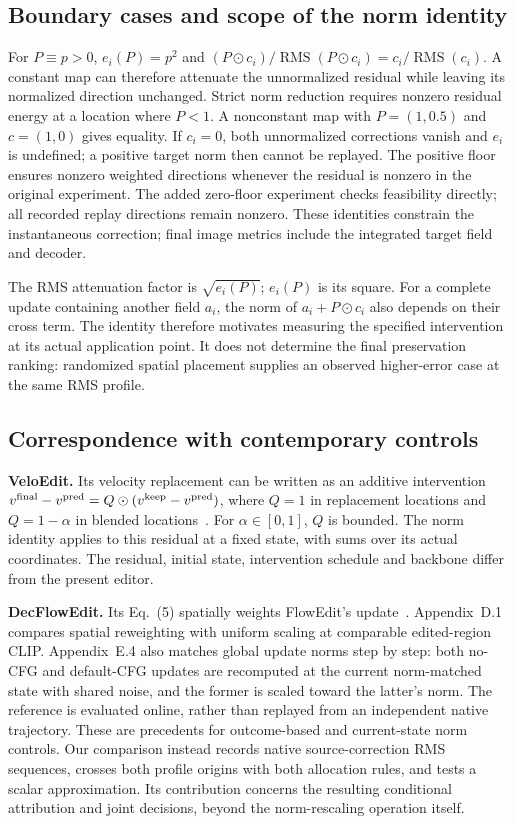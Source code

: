 \documentclass[10pt,doubleanonymous]{ieeeconf}
\newcommand{\RMS}{\operatorname{RMS}}
\begin{document}
\subsection{Boundary cases and scope of the norm identity}
For $P\equiv p>0$, $e_i(P)=p^2$ and $(P\odot c_i)/\RMS(P\odot c_i)=c_i/\RMS(c_i)$. A constant map can therefore attenuate the unnormalized residual while leaving its normalized direction unchanged. Strict norm reduction requires nonzero residual energy at a location where $P<1$. A nonconstant map with $P=(1,0.5)$ and $c=(1,0)$ gives equality. If $c_i=0$, both unnormalized corrections vanish and $e_i$ is undefined; a positive target norm then cannot be replayed. The positive floor ensures nonzero weighted directions whenever the residual is nonzero in the original experiment. The added zero-floor experiment checks feasibility directly; all recorded replay directions remain nonzero. These identities constrain the instantaneous correction; final image metrics include the integrated target field and decoder.

The RMS attenuation factor is $\sqrt{e_i(P)}$; $e_i(P)$ is its square. For a complete update containing another field $a_i$, the norm of $a_i+P\odot c_i$ also depends on their cross term. The identity therefore motivates measuring the specified intervention at its actual application point. It does not determine the final preservation ranking: randomized spatial placement supplies an observed higher-error case at the same RMS profile.

\subsection{Correspondence with contemporary controls}
\textbf{VeloEdit.} Its velocity replacement can be written as an additive intervention $v^{\rm final}-v^{\rm pred}=Q\odot(v^{\rm keep}-v^{\rm pred})$, where $Q=1$ in replacement locations and $Q=1-\alpha$ in blended locations~\cite{li2026veloedit}. For $\alpha\in[0,1]$, $Q$ is bounded. The norm identity applies to this residual at a fixed state, with sums over its actual coordinates. The residual, initial state, intervention schedule and backbone differ from the present editor.

\textbf{DecFlowEdit.} Its Eq.~(5) spatially weights FlowEdit's update~\cite{zhan2026decflowedit}. Appendix~D.1 compares spatial reweighting with uniform scaling at comparable edited-region CLIP. Appendix~E.4 also matches global update norms step by step: both no-CFG and default-CFG updates are recomputed at the current norm-matched state with shared noise, and the former is scaled toward the latter's norm. The reference is evaluated online, rather than replayed from an independent native trajectory. These are precedents for outcome-based and current-state norm controls. Our comparison instead records native source-correction RMS sequences, crosses both profile origins with both allocation rules, and tests a scalar approximation. Its contribution concerns the resulting conditional attribution and joint decisions, beyond the norm-rescaling operation itself.
\end{document}
